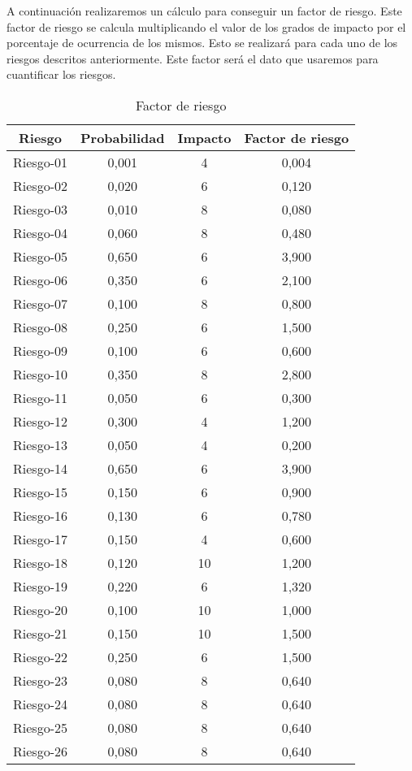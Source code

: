 \par A continuación realizaremos un cálculo para conseguir un factor de riesgo. Este factor de riesgo se calcula multiplicando el valor de los grados de impacto por el porcentaje de ocurrencia de los mismos. Esto se realizará para cada uno de los riesgos descritos anteriormente. Este factor será el dato que usaremos para cuantificar los riesgos.


\begin{table}[H]
\begin{center}
\begin{tabular}{c|ccc}
\textbf{Riesgo} & \textbf{Probabilidad} & \textbf{Impacto} & \textbf{Factor de riesgo} \\
\hline \hline
Riesgo-01	&	0,001	&	4	&	0,004	\\
Riesgo-02	&	0,020	&	6	&	0,120	\\
Riesgo-03	&	0,010	&	8	&	0,080	\\
Riesgo-04	&	0,060	&	8	&	0,480	\\
Riesgo-05	&	0,650	&	6	&	3,900	\\
Riesgo-06	&	0,350	&	6	&	2,100	\\
Riesgo-07	&	0,100	&	8	&	0,800	\\
Riesgo-08	&	0,250	&	6	&	1,500	\\
Riesgo-09	&	0,100	&	6	&	0,600	\\
Riesgo-10	&	0,350	&	8	&	2,800	\\
Riesgo-11	&	0,050	&	6	&	0,300	\\
Riesgo-12	&	0,300	&	4	&	1,200	\\
Riesgo-13	&	0,050	&	4	&	0,200	\\
Riesgo-14	&	0,650	&	6	&	3,900	\\
Riesgo-15	&	0,150	&	6	&	0,900	\\
Riesgo-16	&	0,130	&	6	&	0,780	\\
Riesgo-17	&	0,150	&	4	&	0,600	\\
Riesgo-18	&	0,120	&	10	&	1,200	\\
Riesgo-19	&	0,220	&	6	&	1,320	\\
Riesgo-20	&	0,100	&	10	&	1,000	\\
Riesgo-21	&	0,150	&	10	&	1,500	\\
Riesgo-22	&	0,250	&	6	&	1,500	\\
Riesgo-23	&	0,080	&	8	&	0,640	\\
Riesgo-24	&	0,080	&	8	&	0,640	\\
Riesgo-25	&	0,080	&	8	&	0,640	\\
Riesgo-26	&	0,080	&	8	&	0,640	\\ \hline
\end{tabular}
\caption{Factor de riesgo}
\label{tab:analisis-cualitativo}
\end{center}
\end{table}


